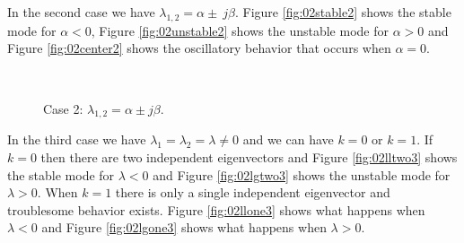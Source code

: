 In the second case we have $\lambda_{1,2}=\alpha\pm\ j\beta$. Figure \ref{fig:02stable2} shows the stable mode for $\alpha<0$, Figure \ref{fig:02unstable2} shows the unstable mode for $\alpha>0$ and Figure \ref{fig:02center2} shows the oscillatory behavior that occurs when $\alpha=0$.

\begin{figure}[ht!]
  \centering
   \hfill
   \\
  \caption{Case 2: $\lambda_{1,2} = \alpha\pm j\beta$.}
  \label{fig:02case2}
\end{figure}

In the third case we have $\lambda_1=\lambda_2=\lambda\neq0$ and we can have $k=0$ or $k=1$. If $k=0$ then there are two independent eigenvectors and Figure \ref{fig:02lltwo3} shows the stable mode for $\lambda<0$ and Figure \ref{fig:02lgtwo3} shows the unstable mode for $\lambda>0$. When $k=1$ there is only a single independent eigenvector and troublesome behavior exists. Figure \ref{fig:02llone3} shows what happens when $\lambda<0$ and Figure \ref{fig:02lgone3} shows what happens when $\lambda>0$.

